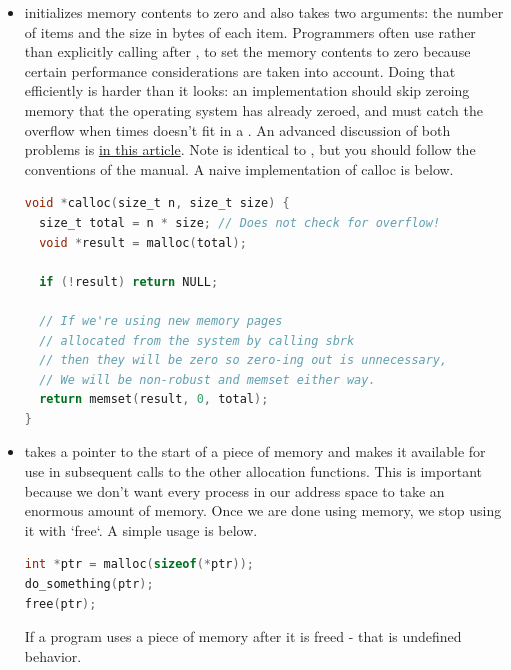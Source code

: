 \begin{itemize}
\begin{lstlisting}[language=C]
}
\end{lstlisting}

\item {} initializes memory contents to zero and also takes two arguments: the number of items and the size in bytes of each item.
Programmers often use  rather than explicitly calling  after , to set the memory contents to zero because certain performance considerations are taken into account.
Doing that efficiently is harder than it looks: an implementation should skip zeroing memory that the operating system has already zeroed, and must catch the overflow when  times  doesn't fit in a .
An advanced discussion of both problems is \href{https://locklessinc.com/articles/calloc/}{in this article}.
Note  is identical to , but you should follow the conventions of the manual.
A naive implementation of calloc is below.

\begin{lstlisting}[language=C]
void *calloc(size_t n, size_t size) {
  size_t total = n * size; // Does not check for overflow!
  void *result = malloc(total);

  if (!result) return NULL;

  // If we're using new memory pages
  // allocated from the system by calling sbrk
  // then they will be zero so zero-ing out is unnecessary,
  // We will be non-robust and memset either way.
  return memset(result, 0, total);
}
\end{lstlisting}

\item {} takes a pointer to the start of a piece of memory and makes it available for use in subsequent calls to the other allocation functions.
This is important because we don't want every process in our address space to take an enormous amount of memory.
Once we are done using memory, we stop using it with `free`.
A simple usage is below.

\begin{lstlisting}[language=C]
int *ptr = malloc(sizeof(*ptr));
do_something(ptr);
free(ptr);
\end{lstlisting}

If a program uses a piece of memory after it is freed - that is undefined behavior.

\end{itemize}

